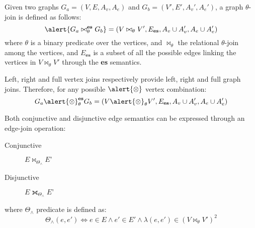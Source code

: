 \begin{multilucido}[Definition]
	\begin{sottolucido}
		\begin{tcolorbox}[title=Graph Join]
			Given two graphs $G_a=(V,E,A_v,A_e)$ and $G_b=(V',E',A_v',A_e')$, a graph $\theta$-join is defined as follows:
			\[\alert{G_a\bowtie_\theta^{\textbf{es}}G_b}=(V\bowtie_\theta V',E_{\textbf{es}},A_v\cup A_v',A_e\cup A_e')\]
			where $\theta$ is a binary predicate over the vertices, and $\bowtie_\theta$ the relational $\theta$-join among the vertices, and $E_{\textbf{es}}$ is a subset of all the possible edges linking the vertices in $V\bowtie_\theta V'$ through the \textbf{es} semantics.
		\end{tcolorbox}
		
		Left, right and full vertex joins respectively provide left, right and full graph joins. Therefore, for any possible $\alert{\otimes}$ vertex combination:
		\[G_a\alert{\otimes}_\theta^{\textbf{es}}G_b=(V\alert{\otimes}_\theta V',E_{\textbf{es}},A_v\cup A_v',A_e\cup A_e')\]
	\end{sottolucido}

	\begin{sottolucido}
		Both conjunctive and disjunctive edge semantics can be expressed through an edge-join operation: 
		\begin{description}
			\item[Conjunctive] $E  \bowtie_{\Theta_\wedge} E’$
			\item[Disjunctive] $E \fullouterjoin_{\Theta_\wedge} E’$
		\end{description}
		where $\Theta_\wedge$ predicate is defined as: \[\Theta_\wedge(e,e')\Leftrightarrow e\in E \wedge e'\in E' \wedge \lambda(e,e')\in(V\bowtie_\theta V' )^2\]
	\end{sottolucido}
\end{multilucido}



%	
